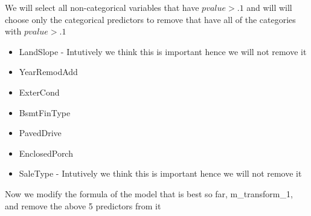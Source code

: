 \documentclass[
]{article}
\newenvironment{Shaded}{\begin{snugshade}}{\end{snugshade}}
\newcommand{\CharTok}[1]{\textcolor[rgb]{0.31,0.60,0.02}{#1}}
\newcommand{\CommentTok}[1]{\textcolor[rgb]{0.56,0.35,0.01}{\textit{#1}}}
\newcommand{\DataTypeTok}[1]{\textcolor[rgb]{0.13,0.29,0.53}{#1}}
\newcommand{\DecValTok}[1]{\textcolor[rgb]{0.00,0.00,0.81}{#1}}
\newcommand{\KeywordTok}[1]{\textcolor[rgb]{0.13,0.29,0.53}{\textbf{#1}}}
\newcommand{\NormalTok}[1]{#1}
\newcommand{\OperatorTok}[1]{\textcolor[rgb]{0.81,0.36,0.00}{\textbf{#1}}}
\newcommand{\StringTok}[1]{\textcolor[rgb]{0.31,0.60,0.02}{#1}}
\providecommand{\tightlist}{%
  \setlength{\itemsep}{0pt}\setlength{\parskip}{0pt}}
\begin{document}
We will select all non-categorical variables that have \(pvalue>.1\) and will will choose only the categorical predictors to remove that have all of the categories with \(pvalue>.1\)

\begin{itemize}
\tightlist
\item
  LandSlope - Intutively we think this is important hence we will not remove it
\item
  YearRemodAdd
\item
  ExterCond
\item
  BsmtFinType
\item
  PavedDrive
\item
  EnclosedPorch
\item
  SaleType - Intutively we think this is important hence we will not remove it
\end{itemize}

Now we modify the formula of the model that is best so far, m\_transform\_1, and remove the above 5 predictors from it

\begin{Shaded}
\end{Shaded}
\end{document}
